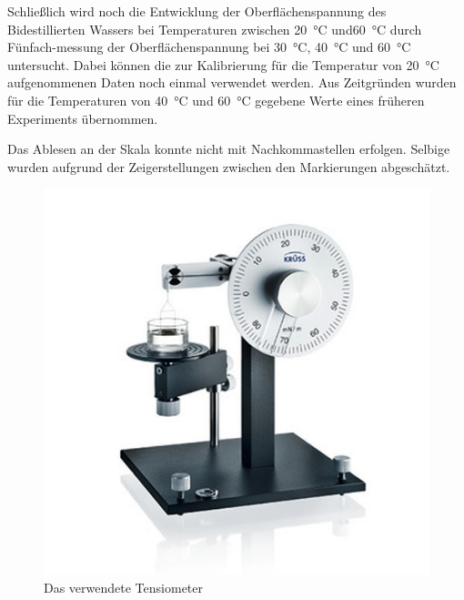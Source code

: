 Schließlich wird noch die Entwicklung der Oberflächenspannung des Bidestillierten Wassers bei Temperaturen zwischen \SI{20}{\degreeCelsius} und\SI{60}{\degreeCelsius} durch Fünfach-messung der Oberflächenspannung bei \SI{30}{\degreeCelsius}, \SI{40}{\degreeCelsius} und \SI{60}{\degreeCelsius} untersucht. Dabei können die zur Kalibrierung für die Temperatur von \SI{20}{\degreeCelsius} aufgenommenen Daten noch einmal verwendet werden. Aus Zeitgründen wurden für die Temperaturen von \SI{40}{\degreeCelsius} und \SI{60}{\degreeCelsius} gegebene Werte eines früheren Experiments übernommen.

Das Ablesen an der Skala konnte nicht mit Nachkommastellen erfolgen. Selbige wurden aufgrund der Zeigerstellungen zwischen den Markierungen abgeschätzt.




\begin{figure}[h!]
\centering
\includegraphics[width=0.7\linewidth]{img/tensiometer}
\caption{Das verwendete Tensiometer}
\label{fig:versuchsaufbau-ebull}
\end{figure}

